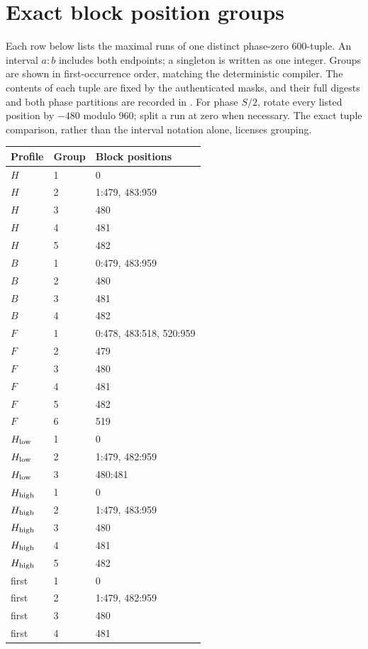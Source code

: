 \documentclass[11pt,letterpaper]{article}
\theoremstyle{definition}\newtheorem{definition}[theorem]{Definition}
\theoremstyle{remark}\newtheorem{remark}[theorem]{Remark}
\newcommand{\code}[1]{\texttt{\detokenize{#1}}}
\begin{document}
\section{Exact block position groups}\label{ptr:fu:app:groups}
Each row below lists the maximal runs of one distinct phase-zero 600-tuple. An interval $a{:}b$ includes both endpoints; a singleton is written as one integer. Groups are shown in first-occurrence order, matching the deterministic compiler. The contents of each tuple are fixed by the authenticated masks, and their full digests and both phase partitions are recorded in \code{fused-receipt.json}. For phase $S/2$, rotate every listed position by $-480$ modulo 960; split a run at zero when necessary. The exact tuple comparison, rather than the interval notation alone, licenses grouping.
\begin{longtable}{@{}llp{3.7in}@{}}
\toprule Profile & Group & Block positions\\\midrule\endhead
$H$ & 1 & 0\\
$H$ & 2 & 1:479, 483:959\\
$H$ & 3 & 480\\
$H$ & 4 & 481\\
$H$ & 5 & 482\\
$B$ & 1 & 0:479, 483:959\\
$B$ & 2 & 480\\
$B$ & 3 & 481\\
$B$ & 4 & 482\\
$F$ & 1 & 0:478, 483:518, 520:959\\
$F$ & 2 & 479\\
$F$ & 3 & 480\\
$F$ & 4 & 481\\
$F$ & 5 & 482\\
$F$ & 6 & 519\\
$H_{\rm low}$ & 1 & 0\\
$H_{\rm low}$ & 2 & 1:479, 482:959\\
$H_{\rm low}$ & 3 & 480:481\\
$H_{\rm high}$ & 1 & 0\\
$H_{\rm high}$ & 2 & 1:479, 483:959\\
$H_{\rm high}$ & 3 & 480\\
$H_{\rm high}$ & 4 & 481\\
$H_{\rm high}$ & 5 & 482\\
first & 1 & 0\\
first & 2 & 1:479, 482:959\\
first & 3 & 480\\
first & 4 & 481\\
\bottomrule\end{longtable}
\end{document}

